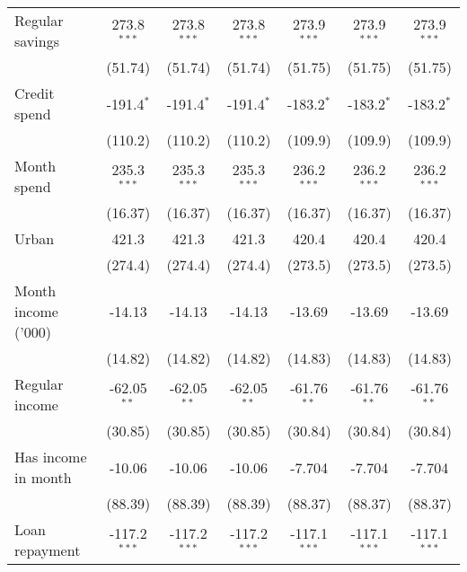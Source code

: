 \begin{table}[htbp]
\begin{footnotesize}
\begin{tabular}{lcccccc}
         Regular savings             & 273.8$^{***}$  & 273.8$^{***}$  & 273.8$^{***}$  & 273.9$^{***}$  & 273.9$^{***}$  & 273.9$^{***}$\\
                                     & (51.74)        & (51.74)        & (51.74)        & (51.75)        & (51.75)        & (51.75)\\
         Credit spend                & -191.4$^{*}$   & -191.4$^{*}$   & -191.4$^{*}$   & -183.2$^{*}$   & -183.2$^{*}$   & -183.2$^{*}$\\
                                     & (110.2)        & (110.2)        & (110.2)        & (109.9)        & (109.9)        & (109.9)\\
         Month spend                 & 235.3$^{***}$  & 235.3$^{***}$  & 235.3$^{***}$  & 236.2$^{***}$  & 236.2$^{***}$  & 236.2$^{***}$\\
                                     & (16.37)        & (16.37)        & (16.37)        & (16.37)        & (16.37)        & (16.37)\\
         Urban                       & 421.3          & 421.3          & 421.3          & 420.4          & 420.4          & 420.4\\
                                     & (274.4)        & (274.4)        & (274.4)        & (273.5)        & (273.5)        & (273.5)\\
         Month income ('000)         & -14.13         & -14.13         & -14.13         & -13.69         & -13.69         & -13.69\\
                                     & (14.82)        & (14.82)        & (14.82)        & (14.83)        & (14.83)        & (14.83)\\
         Regular income              & -62.05$^{**}$  & -62.05$^{**}$  & -62.05$^{**}$  & -61.76$^{**}$  & -61.76$^{**}$  & -61.76$^{**}$\\
                                     & (30.85)        & (30.85)        & (30.85)        & (30.84)        & (30.84)        & (30.84)\\
         Has income in month         & -10.06         & -10.06         & -10.06         & -7.704         & -7.704         & -7.704\\
                                     & (88.39)        & (88.39)        & (88.39)        & (88.37)        & (88.37)        & (88.37)\\
         Loan repayment              & -117.2$^{***}$ & -117.2$^{***}$ & -117.2$^{***}$ & -117.1$^{***}$ & -117.1$^{***}$ & -117.1$^{***}$\\

\end{tabular}
\end{footnotesize}
\end{table}
